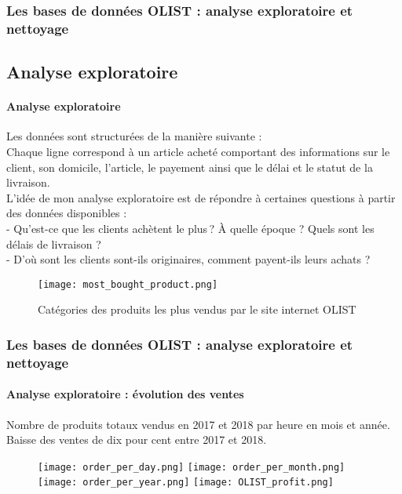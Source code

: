 \documentclass{beamer}
\begin{document}
\begin{frame}

\frametitle{Les bases de données OLIST : analyse exploratoire et nettoyage}
    \subsection{Analyse exploratoire}
	\framesubtitle{Analyse exploratoire}
\begin{footnotesize}
Les données sont structurées de la manière suivante : \\ 

    Chaque ligne correspond à un article acheté comportant des informations sur le client, son domicile, l'article, le payement ainsi que le délai et le statut de la livraison. \\

    L'idée de mon analyse exploratoire est de répondre à certaines questions à partir des données disponibles : \\
    - Qu'est-ce que les clients achètent le plus ? À quelle époque ? Quels sont les délais de livraison ? \\
    - D'où sont les clients sont-ils originaires, comment payent-ils leurs achats ? \\
\end{footnotesize}


\begin{figure}
    \centering
    \texttt{[image: most\_bought\_product.png]}
    \caption{Catégories des produits les plus vendus par le site internet OLIST}
\end{figure} 



\end{frame}


\begin{frame}

\frametitle{Les bases de données OLIST : analyse exploratoire et nettoyage}
	\framesubtitle{Analyse exploratoire : évolution des ventes}
 \begin{footnotesize}
Nombre de produits totaux vendus en 2017 et 2018 par heure en mois et année. Baisse des ventes de dix pour cent entre 2017 et 2018. 
\end{footnotesize}
\begin{figure}
    \centering
    \texttt{[image: order\_per\_day.png]} 
    \texttt{[image: order\_per\_month.png]}
    \texttt{[image: order\_per\_year.png]}
    \texttt{[image: OLIST\_profit.png]}
    
\end{figure}

\end{frame}
\end{document}
